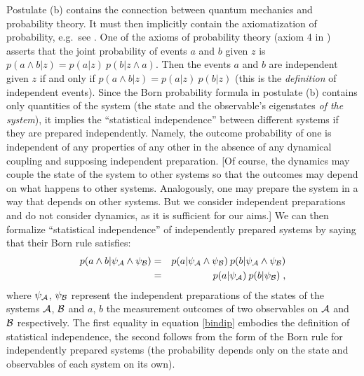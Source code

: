 \documentclass[aps,prl,amsmath,amssymb,twocolumn,nofootinbib]{revtex4}
\theoremstyle{plain}
\theoremstyle{definition}
\theoremstyle{remark}
\def\labell#1{\label{#1}}
\begin{document}
	Postulate (b) contains the connection between quantum mechanics
	and probability theory. It must then implicitly contain the
	axiomatization of probability, e.g.~see
	\cite{ballentinepaper,ballentinebook,cox}. One of the axioms of
	probability theory (axiom 4 in \cite{ballentinepaper}) asserts that
	the joint probability of events $a$ and $b$ given $z$ is
	$p(a\wedge b|z)=p(a|z)\:p(b|z\wedge a)$. Then the events $a$ and $b$ are
	independent given $z$ if and only if $p(a\wedge b|z)=p(a|z)\:p(b|z)$ (this
	is the {\em definition} of independent events). Since the Born
	probability formula in postulate (b) contains only quantities of the
	system (the state and the observable's eigenstates {\em of the
		system}), it implies the ``statistical independence'' between
	different systems if they are prepared independently. Namely, the
	outcome probability of one is independent of any properties of any
	other in the absence of any dynamical coupling and supposing
	independent preparation. [Of course, the dynamics may couple the state
	of the system to other systems so that the outcomes may depend on what
	happens to other systems.  Analogously, one may prepare the system in
	a way that depends on other systems. But we consider independent
	preparations and do not consider dynamics, as it is sufficient for our
	aims.] We can then formalize ``statistical independence'' of
	independently prepared systems by saying that their Born rule
	satisfies:
	\begin{eqnarray}
	p(a\wedge b|\psi_{\cal A}\wedge \psi_{\cal B})&=&p(a|\psi_{\cal A}\wedge \psi_{\cal
		B})\:p(b|\psi_{\cal A}\wedge \psi_{\cal B})\nonumber\\&=& p(a|\psi_{\cal
		A})\:p(b|\psi_{\cal B})
	\labell{bindip}\;,
	\end{eqnarray}
	where $\psi_{\cal A}$, $\psi_{\cal B}$ represent the independent
	preparations of the states of the systems $\cal A$, $\cal B$ and $a$,
	$b$ the measurement outcomes of two observables on $\cal A$ and $\cal
	B$ respectively. The first equality in equation \eqref{bindip} embodies the
	definition of statistical independence, the second follows from the
	form of the Born rule for independently prepared systems (the
	probability depends only on the state and observables of each system
	on its own).
	
\end{document}
